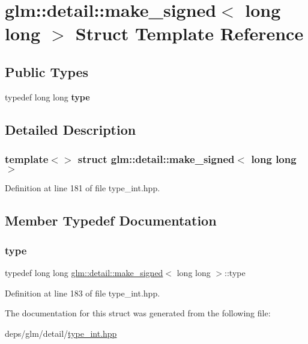 \hypertarget{structglm_1_1detail_1_1make__signed_3_01long_01long_01_4}{}\section{glm\+:\+:detail\+:\+:make\+\_\+signed$<$ long long $>$ Struct Template Reference}
\label{structglm_1_1detail_1_1make__signed_3_01long_01long_01_4}
\subsection*{Public Types}
\begin{DoxyCompactItemize}
\item 
\mbox{\label{structglm_1_1detail_1_1make__signed_3_01long_01long_01_4_a109303fc9f5838a2843711c023a57bc8}} 
typedef long long {\bfseries type}
\end{DoxyCompactItemize}


\subsection{Detailed Description}
\subsubsection*{template$<$$>$\newline
struct glm\+::detail\+::make\+\_\+signed$<$ long long $>$}



Definition at line 181 of file type\+\_\+int.\+hpp.



\subsection{Member Typedef Documentation}
\mbox{\label{structglm_1_1detail_1_1make__signed_3_01long_01long_01_4_a109303fc9f5838a2843711c023a57bc8}} 
\subsubsection{\texorpdfstring{type}{type}}
{\footnotesize\ttfamily typedef long long \hyperlink{structglm_1_1detail_1_1make__signed}{glm\+::detail\+::make\+\_\+signed}$<$ long long $>$\+::type}



Definition at line 183 of file type\+\_\+int.\+hpp.



The documentation for this struct was generated from the following file\+:\begin{DoxyCompactItemize}
\item 
deps/glm/detail/\hyperlink{type__int_8hpp}{type\+\_\+int.\+hpp}\end{DoxyCompactItemize}
